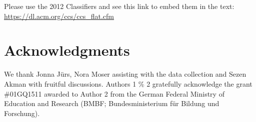 \documentclass{sigchi}
\begin{document}

\printccsdesc
Please use the 2012 Classifiers and see this link to embed them in the text: \url{https://dl.acm.org/ccs/ccs_flat.cfm}





%
%










%
%

\section{Acknowledgments}
We thank Jonna Jürs, Nora Moser assisting with the data collection and Sezen Akman with fruitful discussions.
Authors 1 \% 2 gratefully acknowledge the grant \#01GQ1511 awarded to Author 2 from the German Federal Ministry of Education and Research (BMBF; Bundesministerium für Bildung und Forschung).



\end{document}
